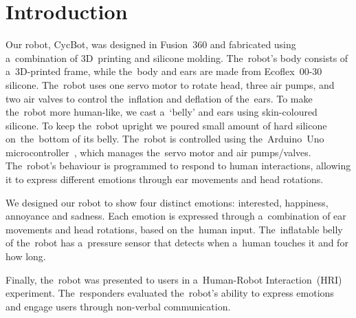 \section{Introduction} %

\par Our robot, CycBot, was designed in Fusion~360 and fabricated using a~combination of 3D~printing and silicone molding. The~robot's body consists of a~3D-printed frame, while the~body and ears are made from Ecoflex~00-30 silicone. The~robot uses one servo motor to rotate head, three air pumps, and two air valves to control the~inflation and deflation of the~ears. To make the~robot more human-like, we cast a~`belly' and ears using skin-coloured silicone. To keep the~robot upright we poured small amount of hard silicone on~the~bottom of its belly. The~robot is controlled using the~Arduino~Uno microcontroller~\cite{arduino-uno}, which manages the~servo motor and air pumps/valves. The~robot's behaviour is programmed to respond to human interactions, allowing it to express different emotions through ear movements and head rotations.

\par We designed our robot to show four distinct emotions: interested, happiness, annoyance and sadness. Each emotion is expressed through a~combination of ear movements and head rotations, based on the~human input. The~inflatable belly of the~robot has a~pressure sensor that detects when a~human touches it and for how long.

\par Finally, the~robot was presented to users in a~Human-Robot Interaction~(HRI) experiment. The~responders evaluated the~robot's ability to express emotions and engage users through non-verbal communication.
